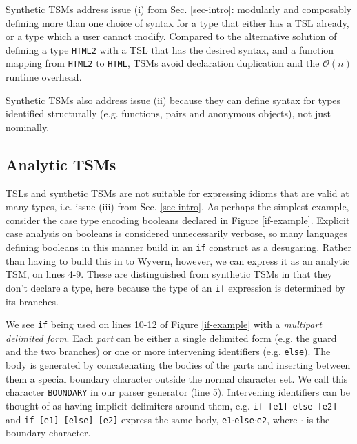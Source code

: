 \documentclass{sig-alternate}[10pt]
\newcommand{\lstinlinew}[1]{\lstinline[style=wyvern]{#1}}
\begin{document}
 Synthetic TSMs address issue (i) from Sec. \ref{sec-intro}: modularly and composably defining more than one choice of syntax for a type that either has a TSL  already, or a type which a user cannot modify. Compared to the alternative solution of defining a type \lstinlinew{HTML2} with a TSL that has the desired syntax, and a function mapping from \lstinlinew{HTML2} to \lstinlinew{HTML},  TSMs avoid declaration duplication and  the $\mathcal{O}(n)$ runtime overhead. %

Synthetic TSMs also address issue (ii) because they can define syntax for types identified structurally (e.g. functions, pairs and anonymous objects), not just nominally.





\subsection{Analytic TSMs}
TSLs and synthetic TSMs are not suitable for expressing idioms that are valid at many types, i.e. issue (iii) from Sec. \ref{sec-intro}. As perhaps the simplest example, consider the case type encoding booleans declared in Figure \ref{if-example}. Explicit case analysis on booleans is considered unnecessarily verbose, so many languages defining booleans in this manner build in an \lstinlinew{if} construct as a desugaring. Rather than having to build this in to Wyvern, however, we can express it as an analytic TSM, on lines 4-9. These are distinguished from synthetic TSMs in that they don't declare a type, here because the type of an \lstinlinew{if} expression is determined by its branches. 

We see \lstinlinew{if} being used on lines 10-12 of Figure \ref{if-example} with a \emph{multipart delimited form}. Each \emph{part} can be either a single delimited form (e.g. the guard and the two branches) or one or more intervening identifiers (e.g. \lstinlinew{else}). The body is generated by concatenating the bodies of the parts and inserting between them a special boundary character outside the normal character set. We call this character \lstinlinew{BOUNDARY} in our parser generator (line 5). Intervening identifiers can be thought of as having implicit delimiters around them, e.g. \lstinlinew{if [e1] else [e2]} and \lstinlinew{if [e1] [else] [e2]} express the same body, \texttt{e1}$\cdot$\lstinlinew{else}$\cdot$\lstinlinew{e2}, where $\cdot$ is the boundary character.
\end{document}
